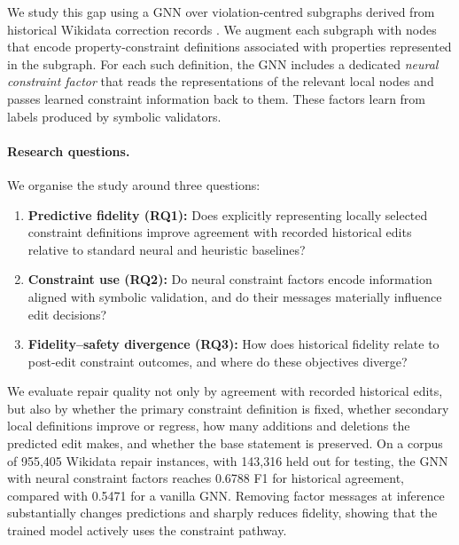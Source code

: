 \documentclass[a4paper,UKenglish,cleveref,autoref,thm-restate]{tgdk-v2021}
\begin{document}
We study this gap using a GNN over violation-centred subgraphs derived from historical Wikidata correction records \cite{vazquez2026structure}. We augment each subgraph with nodes that encode property-constraint definitions associated with properties represented in the subgraph. For each such definition, the GNN includes a dedicated \emph{neural constraint factor} that reads the representations of the relevant local nodes and passes learned constraint information back to them. These factors learn from labels produced by symbolic validators. %

\paragraph*{Research questions.}
We organise the study around three questions:
\begin{enumerate}
    \item \textbf{Predictive fidelity (RQ1):} Does explicitly representing locally selected constraint definitions improve agreement with recorded historical edits relative to standard neural and heuristic baselines?
    \item \textbf{Constraint use (RQ2):} Do neural constraint factors encode information aligned with symbolic validation, and do their messages materially influence edit decisions?
    \item \textbf{Fidelity--safety divergence (RQ3):} How does historical fidelity relate to post-edit constraint outcomes, and where do these objectives diverge?
\end{enumerate}

We evaluate repair quality not only by agreement with recorded historical edits, but also by whether the primary constraint definition is fixed, whether secondary local definitions improve or regress, how many additions and deletions the predicted edit makes, and whether the base statement is preserved. On a corpus of 955,405 Wikidata repair instances, with 143,316 held out for testing, the GNN with neural constraint factors reaches 0.6788 F1 for historical agreement, compared with 0.5471 for a vanilla GNN. Removing factor messages at inference substantially changes predictions and sharply reduces fidelity, showing that the trained model actively uses the constraint pathway.
\end{document}
